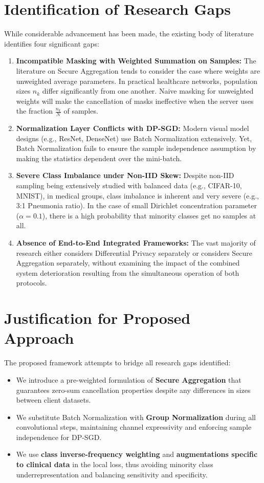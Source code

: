 \documentclass[12pt,a4paper]{report}
\begin{document}
\section{Identification of Research Gaps}
While considerable advancement has been made, the existing body of literature identifies four significant gaps:
\begin{enumerate}
    \item \textbf{Incompatible Masking with Weighted Summation on Samples:} The literature on Secure Aggregation tends to consider the case where weights are unweighted average parameters. In practical healthcare networks, population sizes $n_k$ differ significantly from one another. Naive masking for unweighted weights will make the cancellation of masks ineffective when the server uses the fraction $\frac{n_k}{N}$ of samples.
    \item \textbf{Normalization Layer Conflicts with DP-SGD:} Modern visual model designs (e.g., ResNet, DenseNet) use Batch Normalization extensively. Yet, Batch Normalization fails to ensure the sample independence assumption by making the statistics dependent over the mini-batch.
    \item \textbf{Severe Class Imbalance under Non-IID Skew:} Despite non-IID sampling being extensively studied with balanced data (e.g., CIFAR-10, MNIST), in medical groups, class imbalance is inherent and very severe (e.g., 3:1 Pneumonia ratio). In the case of small Dirichlet concentration parameter ($\alpha=0.1$), there is a high probability that minority classes get no samples at all.
    \item \textbf{Absence of End-to-End Integrated Frameworks:} The vast majority of research either considers Differential Privacy separately or considers Secure Aggregation separately, without examining the impact of the combined system deterioration resulting from the simultaneous operation of both protocols.
\end{enumerate}

\section{Justification for Proposed Approach}
The proposed framework attempts to bridge all research gaps identified:
\begin{itemize}
    \item We introduce a pre-weighted formulation of \textbf{Secure Aggregation} that guarantees zero-sum cancellation properties despite any differences in sizes between client datasets.
    \item We substitute Batch Normalization with \textbf{Group Normalization} during all convolutional steps, maintaining channel expressivity and enforcing sample independence for DP-SGD.
    \item We use \textbf{class inverse-frequency weighting} and \textbf{augmentations specific to clinical data} in the local loss, thus avoiding minority class underrepresentation and balancing sensitivity and specificity.
\end{itemize}
\end{document}
